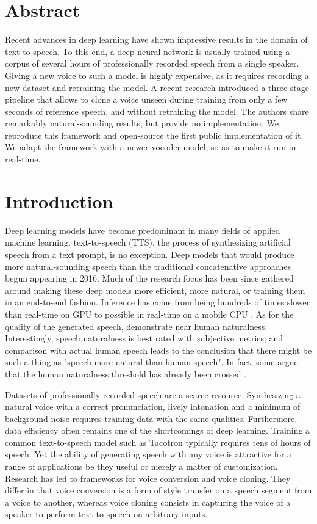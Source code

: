 \documentclass[a4paper, oneside, 12pt, english]{article}
\begin{document}
\section*{Abstract}
Recent advances in deep learning have shown impressive results in the domain of text-to-speech. To this end, a deep neural network is usually trained using a corpus of several hours of professionally recorded speech from a single speaker. Giving a new voice to such a model is highly expensive, as it requires recording a new dataset and retraining the model. A recent research introduced a three-stage pipeline that allows to clone a voice unseen during training from only a few seconds of reference speech, and without retraining the model. The authors share remarkably natural-sounding results, but provide no implementation. We reproduce this framework and open-source the first public implementation of it. We adapt the framework with a newer vocoder model, so as to make it run in real-time.
\clearpage

\tableofcontents
\clearpage

\section{Introduction}
Deep learning models have become predominant in many fields of applied machine learning. text-to-speech (TTS), the process of synthesizing artificial speech from a text prompt, is no exception. Deep models that would produce more natural-sounding speech than the traditional concatenative approaches begun appearing in 2016. Much of the research focus has been since gathered around making these deep models more efficient, more natural, or training them in an end-to-end fashion. Inference has come from being hundreds of times slower than real-time on GPU \citep{WaveNet} to possible in real-time on a mobile CPU \citep{WaveRNN}. As for the quality of the generated speech, \citet{Tacotron2} demonstrate near human naturalness. Interestingly, speech naturalness is best rated with subjective metrics; and comparison with actual human speech leads to the conclusion that there might be such a thing as "speech more natural than human speech". In fact, some argue that the human naturalness threshold has already been crossed \citep{MOSNaturalness}.

Datasets of professionally recorded speech are a scarce resource. Synthesizing a natural voice with a correct pronunciation, lively intonation and a minimum of background noise requires training data with the same qualities. Furthermore, data efficiency often remains one of the shortcomings of deep learning. Training a common text-to-speech model such as Tacotron \citep{Tacotron1} typically requires tens of hours of speech. Yet the ability of generating speech with any voice is attractive for a range of applications be they useful or merely a matter of customization. Research has led to frameworks for voice conversion and voice cloning. They differ in that voice conversion is a form of style transfer on a speech segment from a voice to another, whereas voice cloning consists in capturing the voice of a speaker to perform text-to-speech on arbitrary inputs. 
\end{document}
